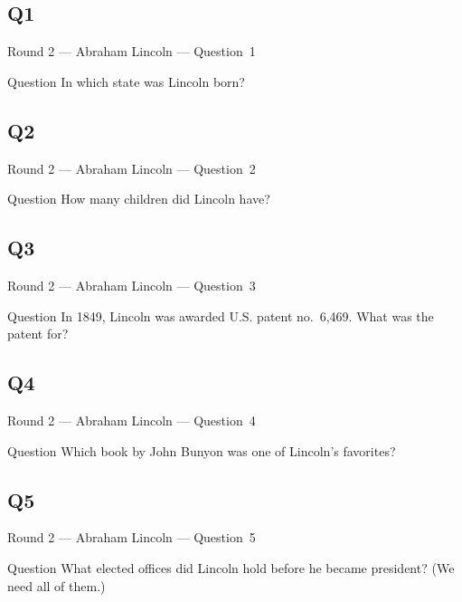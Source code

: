 \documentclass[11pt]{beamer}
\begin{document}
\subsection*{Q1}
\begin{frame}[t]{Round 2 --- Abraham Lincoln --- \mbox{Question 1}}
\vspace{-0.5em}
\begin{block}{Question}
In which state was Lincoln born?
\end{block}
\end{frame}
\subsection*{Q2}
\begin{frame}[t]{Round 2 --- Abraham Lincoln --- \mbox{Question 2}}
\vspace{-0.5em}
\begin{block}{Question}
How many children did Lincoln have?
\end{block}
\end{frame}
\subsection*{Q3}
\begin{frame}[t]{Round 2 --- Abraham Lincoln --- \mbox{Question 3}}
\vspace{-0.5em}
\begin{block}{Question}
In 1849, Lincoln was awarded U.S. patent no.\ 6,469.  What was the patent for?
\end{block}
\end{frame}
\subsection*{Q4}
\begin{frame}[t]{Round 2 --- Abraham Lincoln --- \mbox{Question 4}}
\vspace{-0.5em}
\begin{block}{Question}
Which book by John Bunyon was one of Lincoln's favorites?
\end{block}
\end{frame}
\subsection*{Q5}
\begin{frame}[t]{Round 2 --- Abraham Lincoln --- \mbox{Question 5}}
\vspace{-0.5em}
\begin{block}{Question}
What elected offices did Lincoln hold before he became president? (We need all of them.)
\end{block}
\end{frame}
\end{document}
